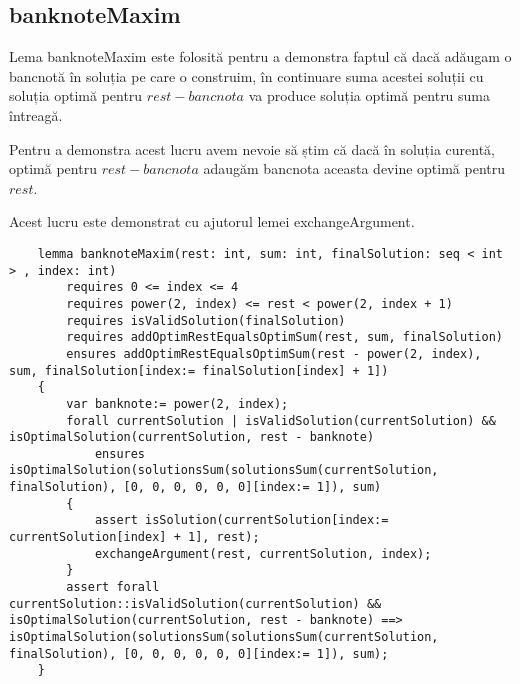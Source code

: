     \subsection{banknoteMaxim}
    Lema banknoteMaxim este folosită pentru a demonstra faptul că dacă adăugam o bancnotă în soluția pe care o 
    construim, în continuare suma acestei soluții cu soluția optimă pentru $ rest - bancnota$ va produce soluția 
    optimă pentru suma întreagă.\par
    Pentru a demonstra acest lucru avem nevoie să știm că dacă în soluția curentă, optimă pentru $ rest - bancnota$  
    adaugăm bancnota aceasta devine optimă pentru $rest$.\par
    Acest lucru este demonstrat cu ajutorul lemei exchangeArgument.
    \begin{lstlisting}
    lemma banknoteMaxim(rest: int, sum: int, finalSolution: seq < int > , index: int)
        requires 0 <= index <= 4
        requires power(2, index) <= rest < power(2, index + 1)
        requires isValidSolution(finalSolution)
        requires addOptimRestEqualsOptimSum(rest, sum, finalSolution)
        ensures addOptimRestEqualsOptimSum(rest - power(2, index), sum, finalSolution[index:= finalSolution[index] + 1]) 
    {
        var banknote:= power(2, index);
        forall currentSolution | isValidSolution(currentSolution) && isOptimalSolution(currentSolution, rest - banknote)
            ensures isOptimalSolution(solutionsSum(solutionsSum(currentSolution, finalSolution), [0, 0, 0, 0, 0, 0][index:= 1]), sum) 
        {
            assert isSolution(currentSolution[index:= currentSolution[index] + 1], rest);
            exchangeArgument(rest, currentSolution, index);
        }
        assert forall currentSolution::isValidSolution(currentSolution) && isOptimalSolution(currentSolution, rest - banknote) ==> isOptimalSolution(solutionsSum(solutionsSum(currentSolution, finalSolution), [0, 0, 0, 0, 0, 0][index:= 1]), sum);
    }
    \end{lstlisting}

